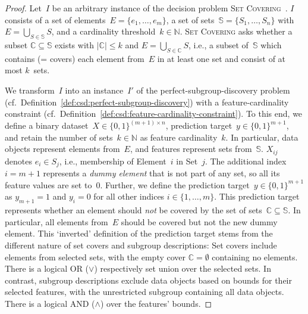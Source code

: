 \begin{proof}
	Let~$I$ be an arbitrary instance of the decision problem \textsc{Set Covering}~\cite{karp1972reducibility}.
	$I$ consists of a set of elements~$E = \{e_1, \dots, e_m\}$, a set of sets~$\mathbb{S} = \{S_1,  \dots, S_n\}$ with $E = \bigcup_{S \in \mathbb{S}} S$, and a cardinality threshold~$k \in \mathbb{N}$.
	\textsc{Set Covering} asks whether a subset $\mathbb{C} \subseteq \mathbb{S}$ exists with $|\mathbb{C}| \leq k$ and $E = \bigcup_{S \in \mathbb{C}} S$, i.e., a subset of~$\mathbb{S}$ which contains (= covers) each element from~$E$ in at least one set and consist of at most $k$~sets.
	
	We transform~$I$ into an instance~$I'$ of the perfect-subgroup-discovery problem (cf.~Definition~\ref{def:csd:perfect-subgroup-discovery}) with a feature-cardinality constraint (cf.~Definition~\ref{def:csd:feature-cardinality-constraint}).
	To this end, we define a binary dataset~$X \in \{0, 1\}^{(m + 1) \times n}$, prediction target~$y \in \{0, 1\}^{m+1}$, and retain the number of sets~$k \in \mathbb{N}$ as feature cardinality~$k$.
	In particular, data objects represent elements from~$E$, and features represent sets from~$\mathbb{S}$.
	$X_{ij}$ denotes $e_i \in S_j$, i.e., membership of Element~$i$ in Set~$j$.
	The additional index $i = m + 1$ represents a \emph{dummy element} that is not part of any set, so all its feature values are set to~0.
	Further, we define the prediction target~$y \in \{0, 1\}^{m+1}$ as $y_{m+1} = 1$ and $y_i = 0$ for all other indices $i \in \{1, \dots, m\}$.
	This prediction target represents whether an element should \emph{not} be covered by the set of sets~$\mathbb{C} \subseteq \mathbb{S}$.
	In particular, all elements from~$E$ should be covered but not the new dummy element.
	This `inverted' definition of the prediction target stems from the different nature of set covers and subgroup descriptions:
	Set covers include elements from selected sets, with the empty cover $\mathbb{C} = \emptyset$ containing no elements.
	There is a logical OR ($\lor$) respectively set union over the selected sets.
	In contrast, subgroup descriptions exclude data objects based on bounds for their selected features, with the unrestricted subgroup containing all data objects.
	There is a logical AND ($\land$) over the features' bounds.
	

\end{proof}
